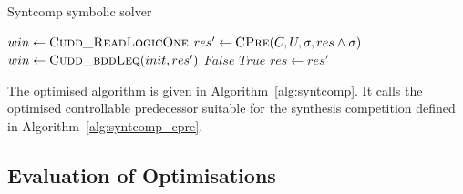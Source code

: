 \begin{algorithm}
\caption{Syntcomp symbolic solver}
\label{alg:syntcomp}

\begin{algorithmic}[1]


    \State $win \gets \Call{Cudd\_ReadLogicOne}{}$
    \Loop
        \State $res' \gets \Call{CPre}{C, U, \sigma, res \land \sigma}$
        \State $win  \gets \Call{Cudd\_bddLeq}{init, res'}$ \label{l:leq}
            \State \Return $False$
        \EndIf
            \State \Return $True$
        \EndIf
        \State $res \gets res'$
    \EndLoop

\EndFunction

\end{algorithmic}
\end{algorithm}

The optimised algorithm is given in Algorithm~\ref{alg:syntcomp}. It calls the optimised controllable predecessor suitable for the synthesis competition defined in Algorithm~\ref{alg:syntcomp_cpre}.

\subsection{Evaluation of Optimisations}
\label{sec:syntcomp_eval}

